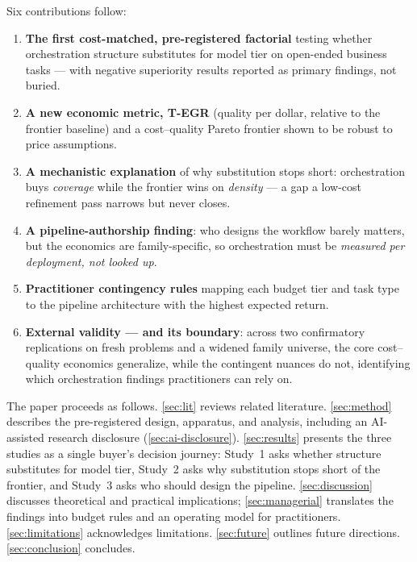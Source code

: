 \documentclass[12pt,a4paper]{article}
\begin{document}
Six contributions follow:
\begin{enumerate}[leftmargin=*,nosep]
  \item \textbf{The first cost-matched, pre-registered factorial} testing whether
        orchestration structure substitutes for model tier on open-ended business
        tasks --- with negative superiority results reported as primary findings,
        not buried.
  \item \textbf{A new economic metric, T-EGR} (quality per dollar, relative to the
        frontier baseline) and a cost--quality Pareto frontier shown to be robust
        to price assumptions.
  \item \textbf{A mechanistic explanation} of why substitution stops short:
        orchestration buys \emph{coverage} while the frontier wins on
        \emph{density} --- a gap a low-cost refinement pass narrows but never
        closes.
  \item \textbf{A pipeline-authorship finding}: who designs the workflow barely
        matters, but the economics are family-specific, so orchestration must be
        \emph{measured per deployment, not looked up}.
  \item \textbf{Practitioner contingency rules} mapping each budget tier and task
        type to the pipeline architecture with the highest expected return.
  \item \textbf{External validity --- and its boundary}: across two confirmatory
        replications on fresh problems and a widened family universe, the core
        cost--quality economics generalize, while the contingent nuances do not,
        identifying which orchestration findings practitioners can rely on.
\end{enumerate}

The paper proceeds as follows. \cref{sec:lit} reviews related literature.
\cref{sec:method} describes the pre-registered design, apparatus, and analysis,
including an AI-assisted research disclosure (\cref{sec:ai-disclosure}).
\cref{sec:results} presents the three studies as a single buyer's decision
journey: Study~1 asks whether structure substitutes for model tier, Study~2
asks why substitution stops short of the frontier, and Study~3 asks who should
design the pipeline. \cref{sec:discussion} discusses theoretical and practical
implications; \cref{sec:managerial} translates the findings into budget rules
and an operating model for practitioners. \cref{sec:limitations} acknowledges
limitations. \cref{sec:future} outlines future directions.
\cref{sec:conclusion} concludes.
\end{document}
